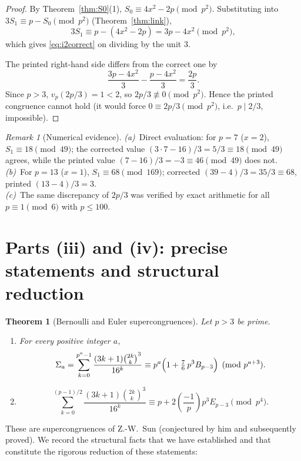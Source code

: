 \documentclass[12pt]{article}
\newtheorem{theorem}{Theorem}
\theoremstyle{remark}
\newtheorem{remark}{Remark}
\newcommand{\leg}[2]{\left(\frac{#1}{#2}\right)}
\newcommand{\bin}[2]{\binom{#1}{#2}}
\begin{document}
\begin{proof}
By Theorem~\ref{thm:S0}(1), $S_0\equiv4x^2-2p\pmod{p^2}$.  Substituting into
$3S_1\equiv p-S_0\pmod{p^2}$ (Theorem~\ref{thm:link}),
\[
3S_1\equiv p-(4x^2-2p)=3p-4x^2\pmod{p^2},
\]
which gives \eqref{eq:i2correct} on dividing by the unit $3$.

The printed right-hand side differs from the correct one by
\[
\frac{3p-4x^2}{3}-\frac{p-4x^2}{3}=\frac{2p}{3}.
\]
Since $p>3$, $v_p(2p/3)=1<2$, so $2p/3\not\equiv0\pmod{p^2}$.  Hence the printed
congruence cannot hold (it would force $0\equiv2p/3\pmod{p^2}$, i.e.\
$p\mid2/3$, impossible).
\end{proof}

\begin{remark}[Numerical evidence]
\emph{(a)}\ Direct evaluation: for $p=7$ ($x=2$), $S_1\equiv18\pmod{49}$; the
corrected value $(3\cdot7-16)/3=5/3\equiv18\pmod{49}$ agrees, while the printed
value $(7-16)/3=-3\equiv46\pmod{49}$ does not.\\
\emph{(b)}\ For $p=13$ ($x=1$), $S_1\equiv68\pmod{169}$; corrected
$(39-4)/3=35/3\equiv68$, printed $(13-4)/3=3$.\\
\emph{(c)}\ The same discrepancy of $2p/3$ was verified by exact arithmetic for
all $p\equiv1\pmod6$ with $p\le100$.
\end{remark}

\section{Parts (iii) and (iv): precise statements and structural reduction}

\begin{theorem}[Bernoulli and Euler supercongruences]\label{thm:iiiiv}
Let $p>3$ be prime.
\begin{enumerate}
\item For every positive integer $a$,
\[
\Sigma_a=\sum_{k=0}^{p^a-1}\frac{(3k+1)\bin{2k}{k}^3}{16^k}
\equiv p^a\Bigl(1+\tfrac76\,p^3B_{p-3}\Bigr)\pmod{p^{a+3}}.
\]
\item
\[
\sum_{k=0}^{(p-1)/2}\frac{(3k+1)\bin{2k}{k}^3}{16^k}
\equiv p+2\leg{-1}{p}p^3E_{p-3}\pmod{p^4}.
\]
\end{enumerate}
\end{theorem}

These are supercongruences of Z.-W.\ Sun (conjectured by him and subsequently
proved).  We record the structural facts that we have established and that
constitute the rigorous reduction of these statements:
\end{document}
